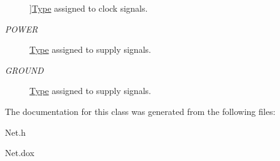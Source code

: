 \begin{Desc}
\begin{description}
{}]\hyperlink{classHurricane_1_1Net_1_1Type}{Type} assigned to clock signals. \item[{\em 
\hypertarget{classHurricane_1_1Net_1_1Type_a2652e3299403e0f5979a848b267163a5a0b7ce81772b3f4df72edb083a52b2748}{P\-O\-W\-E\-R}\label{classHurricane_1_1Net_1_1Type_a2652e3299403e0f5979a848b267163a5a0b7ce81772b3f4df72edb083a52b2748}
}]\hyperlink{classHurricane_1_1Net_1_1Type}{Type} assigned to supply signals. \item[{\em 
\hypertarget{classHurricane_1_1Net_1_1Type_a2652e3299403e0f5979a848b267163a5a87f5f36bbfcfac211f3dff73a8e46e65}{G\-R\-O\-U\-N\-D}\label{classHurricane_1_1Net_1_1Type_a2652e3299403e0f5979a848b267163a5a87f5f36bbfcfac211f3dff73a8e46e65}
}]\hyperlink{classHurricane_1_1Net_1_1Type}{Type} assigned to supply signals. \end{description}
\end{Desc}


The documentation for this class was generated from the following files\-:\begin{DoxyCompactItemize}
\item 
Net.\-h\item 
Net.\-dox\end{DoxyCompactItemize}
